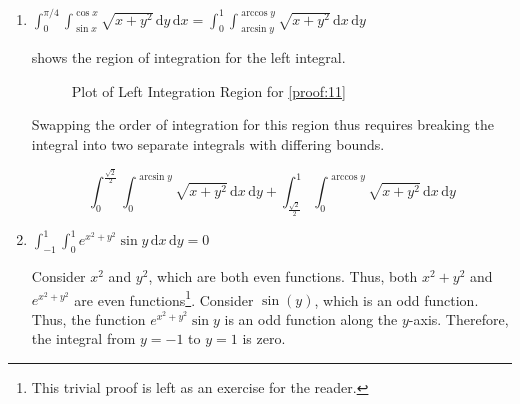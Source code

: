 \documentclass[11pt]{article}
\begin{document}
\begin{enumerate}
\item
  \(\int_0^{\pi/4} \int_{\sin x}^{\cos x} \sqrt{x + y^2} \,\mathrm{d}y
  \,\mathrm{d}x = \int_0^1 \int_{\arcsin y}^{\arccos y} \sqrt{x + y^2} \,
  \mathrm{d}x \,\mathrm{d}y\) \label{proof:11}

   shows the region of integration for the left
  integral.

  \begin{figure}[h]
    \centering
    \caption{Plot of Left Integration Region for \cref{proof:11}}
    \label{fig:11-region-plot}
  \end{figure}

  Swapping the order of integration for this region thus requires breaking the
  integral into two separate integrals with differing bounds.

  \begin{equation*}
    \int_0^{\frac{\sqrt{2}}{2}} \int_0^{\arcsin y} \sqrt{x + y^2} \,
    \mathrm{d}x \,\mathrm{d}y +
    \int_{\frac{\sqrt{2}}{2}}^1 \int_0^{\arccos y} \sqrt{x + y^2} \,
    \mathrm{d}x \,\mathrm{d}y
  \end{equation*}
  
\item
  \(\int_{-1}^{1} \int_{0}^{1} e^{x^2 + y^2} \sin y \, \mathrm{d}x\,
  \mathrm{d}y= 0\)

  Consider \(x^2\) and \(y^2\), which are both even functions. Thus, both
  \(x^2 + y^2\) and \(e^{x^2 + y^2}\) are even
  functions\footnote{\label{fn:trivial} This trivial proof is left as an
    exercise for the reader.}. Consider \(\sin(y)\), which is an odd
  function\footnotemark[\value{footnote}]. Thus, the function
  \(e^{x^2 + y^2} \sin y\) is an odd function along the
  \(y\)-axis\footnotemark[\value{footnote}]. Therefore, the integral from
  \(y = -1\) to \(y = 1\) is zero.
\end{enumerate}
\end{document}
